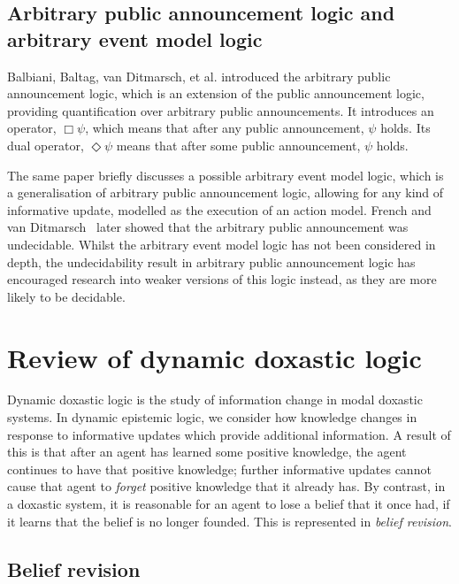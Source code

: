 \subsection*{Arbitrary public announcement logic and arbitrary event model
logic}

Balbiani, Baltag, van Ditmarsch, et al.\cite{balbiani2007arbitrary} introduced
the arbitrary public announcement logic, which is an extension of the public
announcement logic, providing quantification over arbitrary public
announcements. It introduces an operator, $\Box\psi$, which means that after any
public announcement, $\psi$ holds. Its dual operator, $\Diamond\psi$ means that
after some public announcement, $\psi$ holds.

The same paper briefly discusses a possible arbitrary event model logic, which
is a generalisation of arbitrary public announcement logic, allowing for any
kind of informative update, modelled as the execution of an action model. French
and van Ditmarsch~\cite{french2008undecidability} later showed that the
arbitrary public announcement was undecidable. Whilst the arbitrary event model
logic has not been considered in depth, the undecidability result in arbitrary
public announcement logic has encouraged research into weaker versions of this
logic instead, as they are more likely to be decidable.

\section{Review of dynamic doxastic logic}

Dynamic doxastic logic is the study of information change in modal doxastic
systems. In dynamic epistemic logic, we consider how knowledge changes in
response to informative updates which provide additional information. A result
of this is that after an agent has learned some positive knowledge, the agent
continues to have that positive knowledge; further informative updates cannot
cause that agent to {\em forget} positive knowledge that it already has. By
contrast, in a doxastic system, it is reasonable for an agent to lose a belief
that it once had, if it learns that the belief is no longer founded. This is
represented in {\em belief revision}.

\subsection{Belief revision}


